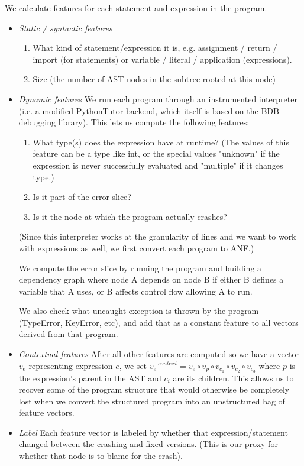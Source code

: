 \documentclass[conference]{IEEEtran}
\begin{document}
We calculate features for each statement and expression in the program.

\begin{itemize}

\item \emph{Static / syntactic features}
\begin{enumerate}
    \item What kind of statement/expression it is, e.g. assignment / return
     / import (for statements) or variable / literal / application (expressions).
    \item Size (the number of AST nodes in the subtree rooted at this node)
\end{enumerate}

\item \emph{Dynamic features}
We run each program through an instrumented interpreter (i.e. a modified PythonTutor
backend, which itself is based on the BDB debugging library). This lets us
compute the following features:
\begin{enumerate}
    \item What type(s) does the expression have at runtime? (The values of this feature
    can be a type like int, or the special values "unknown" if the expression is
    never successfully evaluated and "multiple" if it changes type.)
    \item Is it part of the error slice?
    \item Is it the node at which the program actually crashes?
\end{enumerate}
(Since this interpreter works at the granularity of lines and we want to work with
expressions as well, we first convert each program to ANF.)

We compute the error slice by running the program and building a dependency
graph where node A depends on node B if either B defines a variable that A uses,
or B affects control flow allowing A to run.

We also check what uncaught exception is thrown by the program (TypeError,
KeyError, etc), and add that as a constant feature to all vectors derived from that program.

\item \emph{Contextual features} After all other features are computed so we have a
vector $v_e$ representing expression $e$, we set $v_e^{+context} = v_e \circ
v_p \circ v_{c_1} \circ v_{c_2} \circ v_{c_3}$ where $p$ is the expression's parent
in the AST and $c_i$ are its children. This allows us to recover some of the
program structure that would otherwise be completely lost when we convert the
structured program into an unstructured bag of feature vectors.

\item \emph{Label} Each feature vector is labeled by whether that expression/statement
changed between the crashing and fixed versions. (This is our proxy for whether
that node is to blame for the crash).

\end{itemize}
\end{document}

